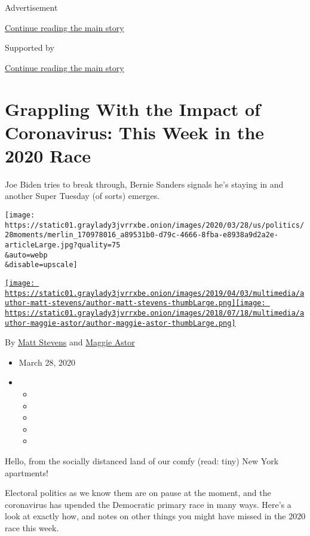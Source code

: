 Advertisement

\protect\hyperlink{after-top}{Continue reading the main story}

Supported by

\protect\hyperlink{after-sponsor}{Continue reading the main story}

\hypertarget{grappling-with-the-impact-of-coronavirus-this-week-in-the-2020-race}{%
\section{Grappling With the Impact of Coronavirus: This Week in the 2020
Race}\label{grappling-with-the-impact-of-coronavirus-this-week-in-the-2020-race}}

Joe Biden tries to break through, Bernie Sanders signals he's staying in
and another Super Tuesday (of sorts) emerges.

\texttt{[image: https://static01.graylady3jvrrxbe.onion/images/2020/03/28/us/politics/28moments/merlin\_170978016\_a89531b0-d79c-4666-8fba-e8938a9d2a2e-articleLarge.jpg?quality=75\\\&auto=webp\\\&disable=upscale]}

\href{https://www.nytimes3xbfgragh.onion/by/matt-stevens}{\texttt{[image: https://static01.graylady3jvrrxbe.onion/images/2019/04/03/multimedia/author-matt-stevens/author-matt-stevens-thumbLarge.png]}}\href{https://www.nytimes3xbfgragh.onion/by/maggie-astor}{\texttt{[image: https://static01.graylady3jvrrxbe.onion/images/2018/07/18/multimedia/author-maggie-astor/author-maggie-astor-thumbLarge.png]}}

By \href{https://www.nytimes3xbfgragh.onion/by/matt-stevens}{Matt
Stevens} and
\href{https://www.nytimes3xbfgragh.onion/by/maggie-astor}{Maggie Astor}

\begin{itemize}
\item
  March 28, 2020
\item
  \begin{itemize}
  \item
  \item
  \item
  \item
  \item
  \end{itemize}
\end{itemize}

Hello, from the socially distanced land of our comfy (read: tiny) New
York apartments!

Electoral politics as we know them are on pause at the moment, and the
coronavirus has upended the Democratic primary race in many ways. Here's
a look at exactly how, and notes on other things you might have missed
in the 2020 race this week.

